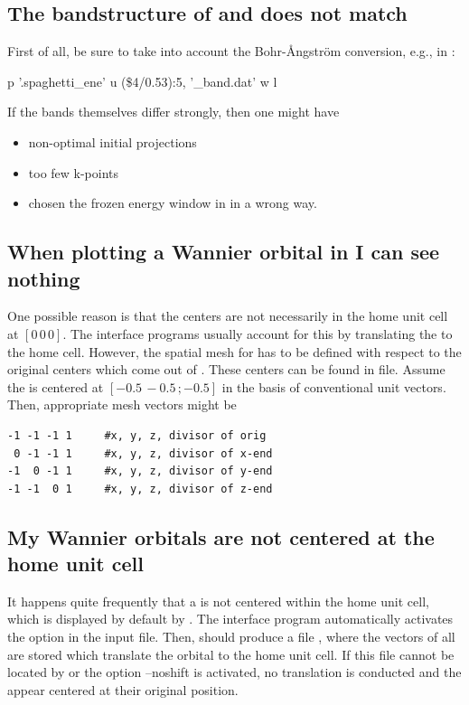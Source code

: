 \subsection{The bandstructure of \wien and \wannier does not match}
First of all, be sure to take into account the Bohr-Ångström
conversion, e.g., in :
\begin{usage}
  p '\case.spaghetti\_ene' u (\$4/0.53):5, '\case{}\_band.dat' w l
\end{usage}

If the bands themselves differ strongly, then one might have
\begin{itemize}
 \item non-optimal initial projections
 \item too few k-points
 \item chosen the frozen energy window in \wannier in a wrong way.
\end{itemize}

\subsection{When plotting a Wannier orbital in \xcrys I can see nothing}
One possible reason is that the \wf centers are not necessarily in the
home unit cell at $[0\, 0\, 0]$.  The interface programs usually
account for this by translating the \wf to the home cell.  However, the
spatial mesh for \wplot has to be defined with respect to the original
centers which come out of \wannier.  These centers can be found in
 file.  Assume the \wf is centered at $[-0.5\, -0.5\,;
-0.5]$ in the basis of conventional unit vectors. Then, appropriate
mesh vectors might be
\begin{Verbatim}
-1 -1 -1 1     #x, y, z, divisor of orig
 0 -1 -1 1     #x, y, z, divisor of x-end
-1  0 -1 1     #x, y, z, divisor of y-end
-1 -1  0 1     #x, y, z, divisor of z-end
\end{Verbatim}

\subsection{My Wannier orbitals are not centered at the home unit
  cell}

It happens quite frequently that a \wf is not centered within the home
unit cell, which is displayed by default by \xcrys. The interface
program \writewin automatically activates the option
 in the \wannier input file. Then,
\wannier should produce a file , where the
vectors of all \wf are stored which translate the orbital to the home
unit cell. If this file cannot be located by \wplottoxsf or the option
--noshift is activated, no translation is conducted and the \wf appear
centered at their original position.


